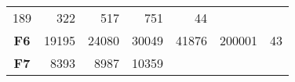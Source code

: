 \documentclass[12pt,a4paper]{article}
\begin{document}
\begin{longtable}[c]{@{}crrrrrr@{}}
\begin{minipage}[t]{0.08\columnwidth}
189
\strut\end{minipage} &
\begin{minipage}[t]{0.09\columnwidth}\raggedleft\strut
322
\strut\end{minipage} &
\begin{minipage}[t]{0.10\columnwidth}\raggedleft\strut
517
\strut\end{minipage} &
\begin{minipage}[t]{0.11\columnwidth}\raggedleft\strut
751
\strut\end{minipage} &
\begin{minipage}[t]{0.07\columnwidth}\raggedleft\strut
44
\strut\end{minipage}\tabularnewline
\begin{minipage}[t]{0.11\columnwidth}\centering\strut
\textbf{F6}
\strut\end{minipage} &
\begin{minipage}[t]{0.08\columnwidth}\raggedleft\strut
19195
\strut\end{minipage} &
\begin{minipage}[t]{0.08\columnwidth}\raggedleft\strut
24080
\strut\end{minipage} &
\begin{minipage}[t]{0.09\columnwidth}\raggedleft\strut
30049
\strut\end{minipage} &
\begin{minipage}[t]{0.10\columnwidth}\raggedleft\strut
41876
\strut\end{minipage} &
\begin{minipage}[t]{0.11\columnwidth}\raggedleft\strut
200001
\strut\end{minipage} &
\begin{minipage}[t]{0.07\columnwidth}\raggedleft\strut
43
\strut\end{minipage}\tabularnewline
\begin{minipage}[t]{0.11\columnwidth}\centering\strut
\textbf{F7}
\strut\end{minipage} &
\begin{minipage}[t]{0.08\columnwidth}\raggedleft\strut
8393
\strut\end{minipage} &
\begin{minipage}[t]{0.08\columnwidth}\raggedleft\strut
8987
\strut\end{minipage} &
\begin{minipage}[t]{0.09\columnwidth}\raggedleft\strut
10359
\strut\end{minipage} &
\begin{minipage}[t]{0.10\columnwidth}\raggedleft\strut

\end{minipage}
\end{longtable}
\end{document}
